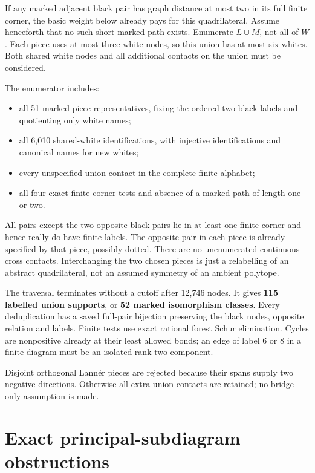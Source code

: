 \documentclass[
  10pt,
]{report}
\providecommand{\tightlist}{%
  \setlength{\itemsep}{0pt}\setlength{\parskip}{0pt}}
\begin{document}
If any marked adjacent black pair has graph distance at most two in its
full finite corner, the basic weight below already pays for this
quadrilateral. Assume henceforth that no such short marked path exists.
Enumerate \(L\cup M\), not all of \(W\). Each piece uses at most three
white nodes, so this union has at most six whites. Both shared white
nodes and all additional contacts on the union must be considered.

The enumerator includes:

\begin{itemize}
\tightlist
\item
  all 51 marked piece representatives, fixing the ordered two black
  labels and quotienting only white names;
\item
  all 6,010 shared-white identifications, with injective identifications
  and canonical names for new whites;
\item
  every unspecified union contact in the complete finite alphabet;
\item
  all four exact finite-corner tests and absence of a marked path of
  length one or two.
\end{itemize}

All pairs except the two opposite black pairs lie in at least one finite
corner and hence really do have finite labels. The opposite pair in each
piece is already specified by that piece, possibly dotted. There are no
unenumerated continuous cross contacts. Interchanging the two chosen
pieces is just a relabelling of an abstract quadrilateral, not an
assumed symmetry of an ambient polytope.

The traversal terminates without a cutoff after 12,746 nodes. It gives
\textbf{115 labelled union supports}, or \textbf{52 marked isomorphism
classes}. Every deduplication has a saved full-pair bijection preserving
the black nodes, opposite relation and labels. Finite tests use exact
rational forest Schur elimination. Cycles are nonpositive already at
their least allowed bonds; an edge of label 6 or 8 in a finite diagram
must be an isolated rank-two component.

Disjoint orthogonal Lannér pieces are rejected because their spans
supply two negative directions. Otherwise all extra union contacts are
retained; no bridge-only assumption is made.

\section{Exact principal-subdiagram
obstructions}\label{exact-principal-subdiagram-obstructions}
\end{document}
